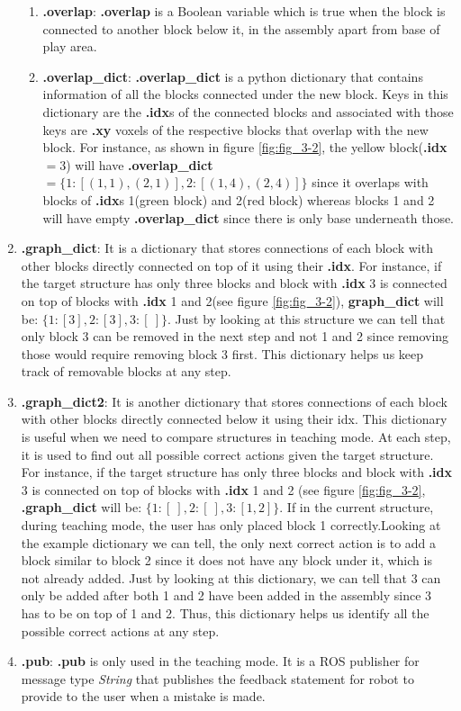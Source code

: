 \begin{enumerate}
\begin{enumerate}
        \item \textbf{.overlap}: \textbf{.overlap} is a Boolean variable which is true when the block is connected to another block below it, in the assembly apart from base of play area.
        \item \textbf{.overlap\_dict}: \textbf{.overlap\_dict} is a python dictionary that contains information of all the blocks connected under the new block. Keys in this dictionary are the \textbf{.idx}s of the connected blocks and associated with those keys are \textbf{.xy} voxels of the respective blocks that overlap with the new block. For instance, as shown in figure \ref{fig:fig_3-2}, the yellow block(\textbf{.idx} $ = 3$) will have \textbf{.overlap\_dict}  $= \{1:[(1,1),(2,1)], 2:[(1,4),(2,4)]\}$ since it overlaps with blocks of \textbf{.idx}s 1(green block) and 2(red block) whereas blocks 1 and 2 will have empty \textbf{.overlap\_dict} since there is only base underneath those.
    \end{enumerate}
    \item \textbf{.graph\_dict}: It is a dictionary that stores connections of each block with other blocks directly connected on top of it using their \textbf{.idx}. For instance, if the target structure has only three blocks and block with \textbf{.idx} 3 is connected on top of blocks with \textbf{.idx} 1 and 2(see figure \ref{fig:fig_3-2}), \textbf{graph\_dict} will be: $\{1: [3], 2: [3], 3:[\:]\}$. Just by looking at this structure we can tell that only block 3 can be removed in the next step and not 1 and 2 since removing those would require removing block 3 first. This dictionary helps us keep track of removable blocks at any step. 
    \item \textbf{.graph\_dict2}: It is another dictionary that stores connections of each block with other blocks directly connected below it using their idx. This dictionary is useful when we need to compare structures in teaching mode. At each step, it is used to find out all possible correct actions given the target structure. For instance, if the target structure has only three blocks and block with \textbf{.idx} 3 is connected on top of blocks with \textbf{.idx} 1 and 2 (see figure \ref{fig:fig_3-2}, \textbf{.graph\_dict} will be: $\{1: [\:], 2: [\:], 3:[1,2]\}$.  If in the current structure, during teaching mode, the user has only placed block 1 correctly.Looking at the example dictionary we can tell, the only next correct action is to add a block similar to block 2 since it does not have any block under it, which is not already added. Just by looking at this dictionary, we can tell that 3 can only be added after both 1 and 2 have been added in the assembly since 3 has to be on top of 1 and 2. Thus, this dictionary helps us identify all the possible correct actions at any step.
    \item \textbf{.pub}: \textbf{.pub} is only used in the teaching mode. It is a ROS publisher for message type \emph{String} that publishes the feedback statement for robot to provide to the user when a mistake is made. 
\end{enumerate}
